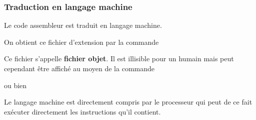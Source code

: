 \begin{frame}[fragile]
\frametitle{Traduction en langage machine}
Le code assembleur  est traduit en \alert{langage machine}.
\medskip

On obtient ce fichier d'extension  par la commande
\begin{center}\end{center}
\bigskip

Ce fichier s'appelle {\bf fichier objet}. Il est illisible pour un humain
mais peut cependant être affiché au moyen de la commande
\begin{center} ou bien  \end{center}
\medskip

Le langage machine est directement compris par le processeur qui peut
de ce fait exécuter directement les instructions qu'il contient.
\end{frame}

